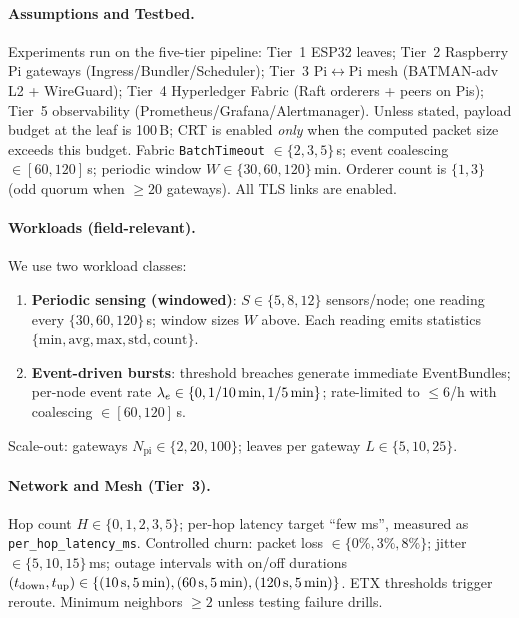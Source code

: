 \documentclass[12pt,onecolumn]{IEEEtran} %
\begin{document}
\paragraph{Assumptions and Testbed.}
Experiments run on the five-tier pipeline: Tier~1 ESP32 leaves; Tier~2 Raspberry Pi gateways (Ingress/Bundler/Scheduler); Tier~3 Pi$\leftrightarrow$Pi mesh (BATMAN-adv L2 + WireGuard); Tier~4 Hyperledger Fabric (Raft orderers + peers on Pis); Tier~5 observability (Prometheus/Grafana/Alertmanager).
Unless stated, payload budget at the leaf is 100\,B; CRT is enabled \emph{only} when the computed packet size exceeds this budget. Fabric \texttt{BatchTimeout} $\in \{2,3,5\}$\,s; event coalescing $\in[60,120]$\,s; periodic window $W\in\{30,60,120\}$\,min. Orderer count is $\{1,3\}$ (odd quorum when $\geq 20$ gateways). All TLS links are enabled.

\paragraph{Workloads (field-relevant).}
We use two workload classes:
\begin{enumerate}[leftmargin=*, itemsep=0.25em]
  \item \textbf{Periodic sensing (windowed)}: $S\in\{5,8,12\}$ sensors/node; one reading every $\{30,60,120\}$\,s; window sizes $W$ above. Each reading emits statistics $\{\text{min},\text{avg},\text{max},\text{std},\text{count}\}$.
  \item \textbf{Event-driven bursts}: threshold breaches generate immediate EventBundles; per-node event rate $\lambda_e\in\{0,1/10\text{\,min},1/5\text{\,min}\}$; rate-limited to $\leq6$/h with coalescing $\in[60,120]$\,s.
\end{enumerate}
Scale-out: gateways $N_{\text{pi}}\in\{2,20,100\}$; leaves per gateway $L\in\{5,10,25\}$.

\paragraph{Network and Mesh (Tier~3).}
Hop count $H\in\{0,1,2,3,5\}$; per-hop latency target ``few ms'', measured as \texttt{per\_hop\_latency\_ms}. Controlled churn: packet loss $\in\{0\%,3\%,8\%\}$; jitter $\in\{5,10,15\}$\,ms; outage intervals with on/off durations $(t_{\text{down}},t_{\text{up}})\in\{(10\text{\,s},5\text{\,min}),(60\text{\,s},5\text{\,min}),(120\text{\,s},5\text{\,min})\}$. ETX thresholds trigger reroute. Minimum neighbors $\geq 2$ unless testing failure drills.
\end{document}
